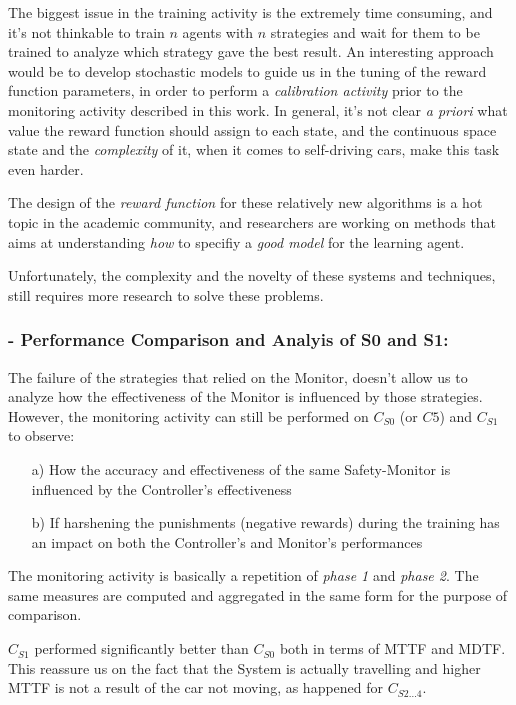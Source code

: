 The biggest issue in the training activity is the extremely time consuming, and it's not thinkable to train $n$ agents with $n$ strategies and wait for them to be trained to analyze which strategy gave the best result.
An interesting approach would be to develop stochastic models to guide us in the tuning of the reward function parameters, in order to perform a \textsl{calibration activity} prior to the monitoring activity described in this work. In general, it's not clear \textsl{a priori} what value the reward function should assign to each state, and the continuous space state and the \textsl{complexity} of it, when it comes to self-driving cars, make this task even harder.

The design of the \textsl{reward function} for these relatively new algorithms is a hot topic in the academic community, and researchers are working on methods that aims at understanding \textsl{how} to specifiy a \textsl{good model} for the learning agent. \cite{reward1} \cite{reward2} \cite{reward3}

Unfortunately, the complexity and the novelty of these systems and techniques, still requires more research to solve these problems.

\subsubsection{- Performance Comparison and Analyis of S0 and S1:}

The failure of the strategies that relied on the Monitor, doesn't allow us to analyze how the effectiveness of the Monitor is influenced by those strategies. However, the monitoring activity can still be performed on $C_{S0}$ (or $C5$) and $C_{S1}$ to observe:

\begin{itemize}
	\item[a)] How the accuracy and effectiveness of the same Safety-Monitor is influenced by the Controller's effectiveness
	\item[b)] If harshening the punishments (negative rewards) during the training has an impact on both the Controller's and Monitor's performances
\end{itemize}

The monitoring activity is basically a repetition of \textsl{phase 1} and \textsl{phase 2}. The same measures are computed and aggregated in the same form for the purpose of comparison.

$C_{S1}$ performed significantly better than $C_{S0}$ both in terms of MTTF and MDTF. This reassure us on the fact that the System is actually travelling and higher MTTF is not a result of the car not moving, as happened for $C_{S2\dots 4}$.

